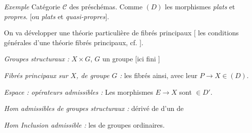 \documentclass[11pt,a4paper]{article}
\begin{document}
\emph{Exemple} Catégorie $\mathcal{C}$ des préschémas. 
Comme $(D)$ les morphismes \emph{plats} et \emph{propres}.
[ou \emph{plats} et \emph{quasi-propres}].

On va développer une théorie particulière de
fibrés principaux [ les conditions générales
\struck{\ill{}} d'une théorie \ill{} fibrés principaux, cf. \ill{}].

\emph{Groupes structuraux :} $X \times G$, $G$ un groupe 
[ici fini ]

\emph{Fibrés principaux sur $X$, de groupe $G$ :} les fibrés
 ainsi, avec leur $P \to X \in (D)$.


\emph{Espace : opérateurs admissibles :} Les morphismes $E \to X$ sont
$\in D'$.

\emph{Hom admissibles de groupes structuraux :} \ill{} dérivé
de \ill{} \ill{} d'un \ill{} de \ill{}

\emph{Hom Inclusion admissible :} les  \ill{}
de groupes ordinaires.
\end{document}
